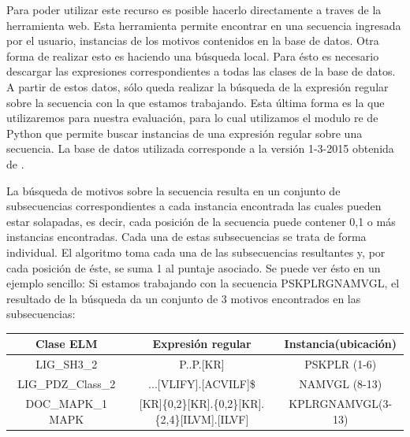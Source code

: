 Para poder utilizar este recurso es posible hacerlo directamente a traves de la herramienta web\cite{elmweb}. 
Esta herramienta permite encontrar en una secuencia ingresada por el usuario, instancias de los motivos contenidos en la base de datos.
Otra forma de realizar esto es haciendo una búsqueda local. Para ésto es necesario descargar las expresiones correspondientes a todas las clases de la base de datos. 
A partir de estos datos, sólo queda realizar la búsqueda de la expresión regular sobre la secuencia con la que estamos trabajando.
Esta última forma es la que utilizaremos para nuestra evaluación, para lo cual utilizamos el modulo re de Python que permite buscar instancias de una expresión regular sobre una secuencia.
La base de datos utilizada corresponde a la versión 1-3-2015 obtenida de \cite{elmweb}.

La búsqueda de motivos sobre la secuencia resulta en un conjunto de subsecuencias correspondientes a cada instancia encontrada las cuales pueden estar solapadas, es decir, cada posición de la secuencia puede contener 0,1 o más instancias encontradas. 
Cada una de estas subsecuencias se trata de forma individual.
El algoritmo toma cada una de las subsecuencias resultantes y, por cada posición de éste, se suma 1 al puntaje asociado.
Se puede ver ésto en un ejemplo sencillo:
Si estamos trabajando con la secuencia PSKPLRGNAMVGL, el resultado de la búsqueda da un conjunto de 3 motivos encontrados en las subsecuencias:
% 

\noindent 
\begin{tabular}{c|c|c} 
\textbf{Clase ELM} & \textbf{Expresión regular} & \textbf{Instancia(ubicación)}\\ \hline
LIG\_SH3\_2 & P..P.[KR] & PSKPLR (1-6)\\ 
LIG\_PDZ\_Class\_2 & ...[VLIFY].[ACVILF]\$ & NAMVGL (8-13)  \\
DOC\_MAPK\_1 MAPK  & [KR]\{0,2\}[KR].\{0,2\}[KR].\{2,4\}[ILVM].[ILVF] & KPLRGNAMVGL(3-13)
\end{tabular}



